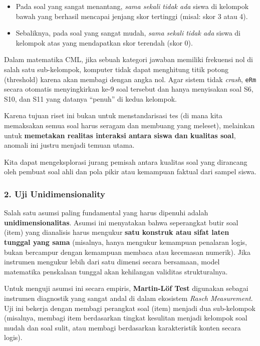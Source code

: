 \documentclass[
]{article}
\begin{document}
\begin{itemize}
\item
  Pada soal yang sangat menantang, \emph{sama sekali tidak ada} siswa di
  kelompok bawah yang berhasil mencapai jenjang skor tertinggi (misal:
  skor 3 atau 4).
\item
  Sebaliknya, pada soal yang sangat mudah, \emph{sama sekali tidak ada}
  siswa di kelompok atas yang mendapatkan skor terendah (skor 0).
\end{itemize}

Dalam matematika CML, jika sebuah kategori jawaban memiliki frekuensi
nol di salah satu sub-kelompok, komputer tidak dapat menghitung titik
potong (threshold) karena akan membagi dengan angka nol. Agar sistem
tidak \emph{crash}, \texttt{eRm} secara otomatis menyingkirkan ke-9 soal
tersebut dan hanya menyisakan soal S6, S10, dan S11 yang datanya
``penuh'' di kedua kelompok.

Karena tujuan riset ini bukan untuk menstandarisasi tes (di mana kita
memaksakan semua soal harus seragam dan membuang yang meleset),
melainkan untuk \textbf{memetakan realitas interaksi antara siswa dan
kualitas soal}, anomali ini justru menjadi temuan utama.

Kita dapat mengeksplorasi jurang pemisah antara kualitas soal yang
dirancang oleh pembuat soal ahli dan pola pikir atau kemampuan faktual
dari sampel siswa.

\subsubsection{2. Uji Unidimensionality}\label{uji-unidimensionality}

Salah satu asumsi paling fundamental yang harus dipenuhi adalah
\textbf{unidimensionalitas}. Asumsi ini menyatakan bahwa seperangkat
butir soal (item) yang dianalisis harus mengukur \textbf{satu konstruk
atau sifat laten tunggal yang sama} (misalnya, hanya mengukur kemampuan
penalaran logis, bukan bercampur dengan kemampuan membaca atau kecemasan
numerik). Jika instrumen mengukur lebih dari satu dimensi secara
bersamaan, model matematika penskalaan tunggal akan kehilangan validitas
strukturalnya.

Untuk menguji asumsi ini secara empiris, \textbf{Martin-Löf Test}
digunakan sebagai instrumen diagnostik yang sangat andal di dalam
ekosistem \emph{Rasch Measurement}. Uji ini bekerja dengan membagi
perangkat soal (item) menjadi dua sub-kelompok (misalnya, membagi item
berdasarkan tingkat kesulitan menjadi kelompok soal mudah dan soal
sulit, atau membagi berdasarkan karakteristik konten secara logis).
\end{document}

